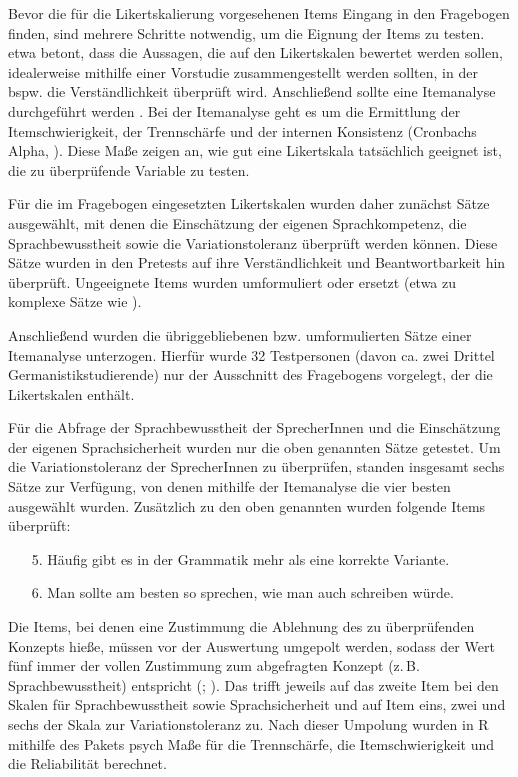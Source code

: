 Bevor die für die Likertskalierung vorgesehenen Items Eingang in den Fragebogen finden, sind mehrere Schritte notwendig, um die Eignung der Items zu testen. \citet[1255]{Garrett2005} etwa betont, dass die Aussagen, die auf den Likertskalen bewertet werden sollen, idealerweise mithilfe einer Vorstudie zusammengestellt werden sollten, in der bspw. die Verständlichkeit überprüft wird. Anschließend sollte eine Itemanalyse durchgeführt werden \citep[s.][289]{Doring2016}. Bei der Itemanalyse geht es um die Ermittlung der Itemschwierigkeit, der Trennschärfe und der internen Konsistenz (Cronbachs Alpha, \citealp[s.][289]{Doring2016}). Diese Maße zeigen an, wie gut eine Likertskala tatsächlich geeignet ist, die zu überprüfende Variable zu testen.

Für die im Fragebogen eingesetzten Likertskalen wurden daher zunächst Sätze ausgewählt, mit denen die Einschätzung der eigenen Sprachkompetenz, die Sprachbewusstheit sowie die Variationstoleranz überprüft werden können. 
Diese Sätze wurden in den Pretests auf ihre Verständlichkeit und Beantwortbarkeit hin überprüft. 
Ungeeignete Items wurden umformuliert oder ersetzt (etwa zu komplexe Sätze wie ).
 
Anschließend wurden die übriggebliebenen bzw. umformulierten Sätze einer Itemanalyse unterzogen. 
Hierfür wurde 32 Testpersonen (davon ca. zwei Drittel Germanistikstudierende) nur der Ausschnitt des Fragebogens vorgelegt, der die Likertskalen enthält. 

Für die Abfrage der Sprachbewusstheit der SprecherInnen und die Einschätzung der eigenen Sprachsicherheit wurden nur die oben genannten Sätze getestet. 
Um die Variationstoleranz der SprecherInnen zu überprüfen, standen insgesamt sechs Sätze zur Verfügung, von denen mithilfe der Itemanalyse die vier besten ausgewählt wurden. 
Zusätzlich zu den oben genannten wurden folgende Items überprüft: 
\begin{enumerate}
\item[5.] Häufig gibt es in der Grammatik mehr als eine korrekte Variante.  
\item[6.] Man sollte am besten so sprechen, wie man auch schreiben würde. 
\end{enumerate}
Die Items, bei denen eine Zustimmung die Ablehnung des zu überprüfenden Konzepts hieße, müssen vor der Auswertung umgepolt werden, sodass der Wert fünf immer der vollen Zustimmung zum abgefragten Konzept (z.\,B. Sprachbewusstheit) entspricht (\citealp[s.][242]{Diekmann2008}; \citealp[75]{Rasinger2010}). 
Das trifft jeweils auf das zweite Item bei den Skalen für Sprachbewusstheit sowie Sprachsicherheit und auf Item eins, zwei und sechs der Skala zur Variationstoleranz zu. 
Nach dieser Umpolung wurden in R \citep[][Version 3.6.1]{RCoreTeam2019} mithilfe des Pakets psych \citep[][Version 2.0.7]{Revelle2016} Maße für die Trennschärfe, die Itemschwierigkeit und die Reliabilität berechnet.


